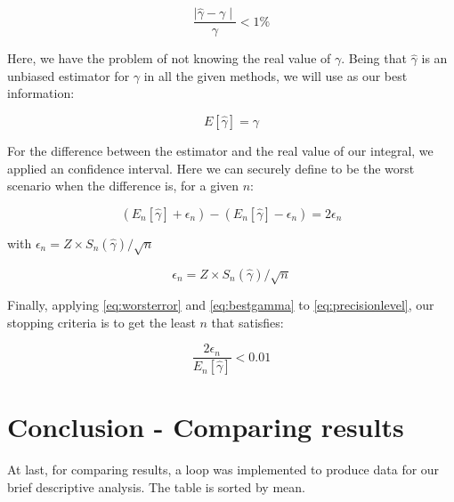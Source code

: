 \documentclass{article}
\begin{document}
\begin{itemize}
\begin{equation}
    \frac{\mid\hat{\gamma}-\gamma\mid}{\gamma} < 1\%
\label{eq:precisionlevel}
\end{equation}

Here, we have the problem of not knowing the real value of $\gamma$. Being that $\hat{\gamma}$ is an unbiased estimator for $\gamma$ in all the given methods, we will use as our best information:

\begin{equation}
    E[\hat{\gamma}] = \gamma
\label{eq:bestgamma}
\end{equation}

For the difference between the estimator and the real value of our integral, we applied an confidence interval. Here we can securely define to be the worst scenario when the difference is, for a given $n$:

\begin{equation}
    (E_n[\hat{\gamma}] + \epsilon_n) - 
    (E_n[\hat{\gamma}] - \epsilon_n) =
    2 \epsilon_n
\label{eq:worsterror}
\end{equation}

\begin{center}
    with $\epsilon_n = Z \times S_n(\hat{\gamma})/\sqrt{n}$
\end{center}

\begin{equation}
    \epsilon_n = Z \times S_n(\hat{\gamma})/\sqrt{n}
\end{equation}


Finally, applying \ref{eq:worsterror} and \ref{eq:bestgamma} to \ref{eq:precisionlevel}, our stopping criteria is to get the least $n$ that satisfies:

\begin{equation}
    \frac{2 \epsilon_n}{E_n[\hat{\gamma}]} < 0.01
\label{eq:stoppingcriteria}
\end{equation}



\end{itemize}


\section{Conclusion - Comparing results}
At last, for comparing results, a loop was implemented to produce data for our brief descriptive analysis. The table is sorted by mean.
\end{document}

